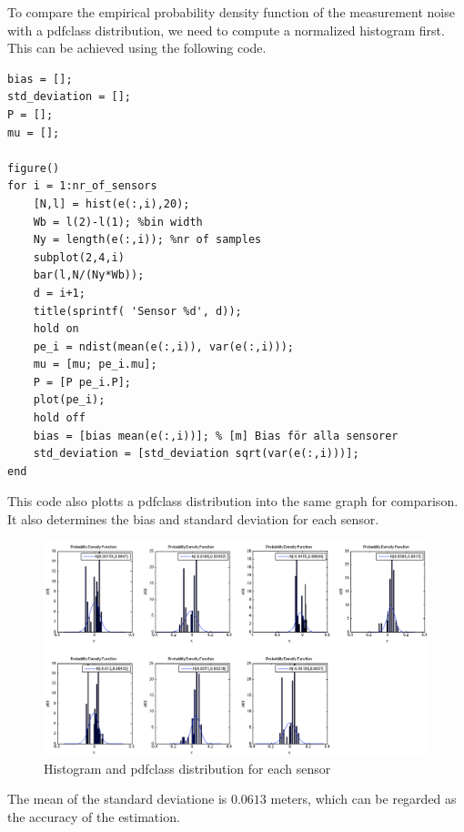 \documentclass[10pt,a4paper]{report}
\begin{document}
To compare the empirical probability density function of the measurement noise with a pdfclass distribution, we need to compute a normalized histogram first. This can be achieved using the following code.
\begin{verbatim}
bias = [];
std_deviation = [];
P = [];
mu = [];

figure()
for i = 1:nr_of_sensors
    [N,l] = hist(e(:,i),20);
    Wb = l(2)-l(1); %bin width
    Ny = length(e(:,i)); %nr of samples
    subplot(2,4,i)
    bar(l,N/(Ny*Wb));
    d = i+1;
    title(sprintf( 'Sensor %d', d));
    hold on
    pe_i = ndist(mean(e(:,i)), var(e(:,i)));
    mu = [mu; pe_i.mu];
    P = [P pe_i.P];
    plot(pe_i);
    hold off
    bias = [bias mean(e(:,i))]; % [m] Bias för alla sensorer
    std_deviation = [std_deviation sqrt(var(e(:,i)))];
end
\end{verbatim}
This code also plotts a pdfclass distribution into the same graph for comparison. It also determines the bias and standard deviation for each sensor. 
\begin{figure}[H]
  \includegraphics[width = 400pt]{histogram.png}
  \caption{Histogram and pdfclass distribution for each sensor}
  \label{histogram}
\end{figure}
The mean of the standard deviatione is $0.0613$ meters, which can be regarded as the accuracy of the estimation.



\newpage
\end{document}
